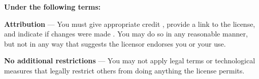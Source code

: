 \vspace{0.5cm}
\noindent \textbf{\large Under the following terms:}

\vspace{0.25cm}
 
\noindent \textbf{Attribution} — You must give appropriate credit , provide a link to the license, and indicate if changes were made . You may do so in any reasonable manner, but not in any way that suggests the licensor endorses you or your use.

\vspace{0.1cm}

\noindent \textbf{No additional restrictions} — You may not apply legal terms or technological measures that legally restrict others from doing anything the license permits.
